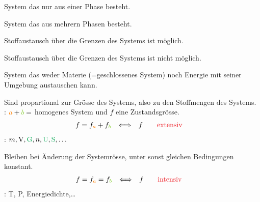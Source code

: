 \begin{defnbox}\nospacing
  \begin{defn}
    System das nur aus einer Phase besteht.
  \end{defn}
\end{defnbox}
\begin{defnbox}
  \begin{defn}
    System das aus mehrern Phasen besteht.
  \end{defn}
\end{defnbox}
\begin{defnbox}
  \begin{defn}
    Stoffaustausch über die Grenzen des Systems ist möglich.
  \end{defn}
\end{defnbox}
\begin{defnbox}
  \begin{defn}
    Stoffaustausch über die Grenzen des Systems ist nicht möglich.
  \end{defn}
\end{defnbox}
\begin{defnbox}
  \begin{defn}\label{defn:abgSys}
    System das weder Materie (=geschlossenes System) noch Energie mit seiner Umgebung austauschen kann.
  \end{defn}
\end{defnbox}
\begin{defnbox}\nospacing
  \begin{defn}\nospacing
    Sind propartional zur Grösse des Systems, also zu den Stoffmengen des Systems.\\
    : $\mca+\mcb=$ homogenes System und $f$ eine Zustandsgrösse.
    \begin{align*}
      &f=f_{\mca}+f_{\mcb}&\Longleftrightarrow&&f&\qquad \text{\rd{extensiv}}
    \end{align*}
    : $m, \Vz, \Gpot, n, \Upot, \Spot,\ldots$
  \end{defn}
\end{defnbox}
\begin{defnbox}
\begin{defn}\nospacing
  Bleiben bei Änderung der Systemrösse, unter sonst gleichen Bedingungen konstant.
  \begin{align*}
    &f=f_{\mca}=f_{\mcb}&\Longleftrightarrow&&f&\qquad \text{\rd{intensiv}}
  \end{align*}
  : T, P, Energiedichte,\ldots
\end{defn}
\end{defnbox}
